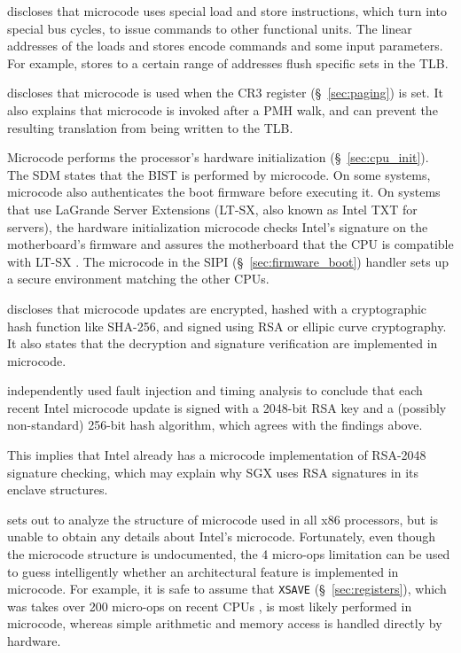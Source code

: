 \cite{intel1997microspace} discloses that microcode uses special load and store
instructions, which turn into special bus cycles, to issue commands to other
functional units. The linear addresses of the loads and stores encode commands
and some input parameters. For example, stores to a certain range of addresses
flush specific sets in the TLB.

\cite{intel2009pipeline} discloses that microcode is used when the CR3 register
(\S~\ref{sec:paging}) is set. It also explains that microcode is invoked after
a PMH walk, and can prevent the resulting translation from being written to the
TLB.

Microcode performs the processor's hardware initialization
(\S~\ref{sec:cpu_init}). The SDM states that the BIST is performed by
microcode. On some systems, microcode also authenticates the boot firmware
\cite{intel2012uefihypervisor} before executing it. On systems that use
LaGrande Server Extensions (LT-SX, also known as Intel TXT for servers), the
hardware initialization microcode checks Intel's signature on the motherboard's
firmware and assures the motherboard that the CPU is compatible with LT-SX
\cite{intel2012ltsx}. The microcode in the SIPI (\S~\ref{sec:firmware_boot})
handler sets up a secure environment matching the other CPUs.

\cite{intel2012patching} discloses that microcode updates are encrypted, hashed
with a cryptographic hash function like SHA-256, and signed using RSA or
ellipic curve cryptography. It also states that the decryption and signature
verification are implemented in microcode.

\cite{hawkes2012microcode} independently used fault injection and timing
analysis to conclude that each recent Intel microcode update is signed with a
2048-bit RSA key and a (possibly non-standard) 256-bit hash algorithm, which
agrees with the findings above.

This
implies that Intel already has a microcode implementation of RSA-2048 signature
checking, which may explain why SGX uses RSA signatures in its enclave
structures.

\cite{chen2014microcode} sets out to analyze the structure of microcode used in
all x86 processors, but is unable to obtain any details about Intel's
microcode. Fortunately, even though the microcode structure is undocumented,
the 4 micro-ops limitation can be used to guess intelligently whether an
architectural feature is implemented in microcode. For example, it is safe to
assume that \texttt{XSAVE} (\S~\ref{sec:registers}), which was takes over 200
micro-ops on recent CPUs \cite{fog2014microops}, is most likely performed in
microcode, whereas simple arithmetic and memory access is handled directly by
hardware.

